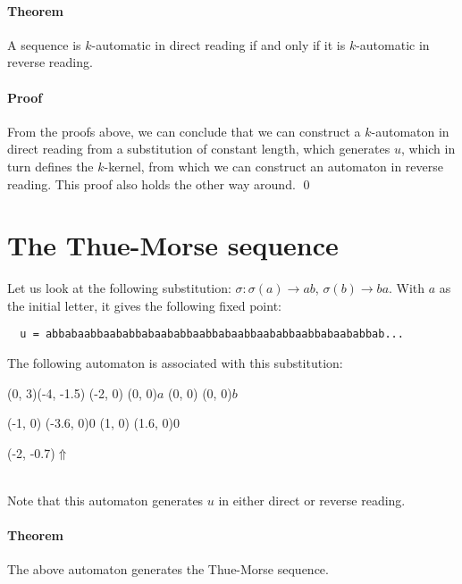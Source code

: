 \documentclass{article}
\begin{document}
\paragraph{Theorem} A sequence is $k$-automatic in direct reading if and only
if it is $k$-automatic in reverse reading.

\paragraph{Proof}
From the proofs above, we can conclude that we can construct a $k$-automaton in
direct reading from a substitution of constant length, which generates $u$,
which in turn defines the $k$-kernel, from which we can construct an automaton
in reverse reading. This proof also holds the other way around. \qed

\section*{The Thue-Morse sequence}
Let us look at the following substitution: $\sigma: \sigma(a) \rightarrow ab$,
$\sigma(b) \rightarrow ba$. With $a$ as the initial letter, it gives the
following fixed point:
\begin{verbatim}
  u = abbabaabbaababbabaababbaabbabaabbaababbaabbabaababbab...
\end{verbatim}
The following automaton is associated with this
substitution:\\
\begin{graph}(0, 3)(-4, -1.5)
  (-2, 0) (0, 0){$a$}
  (0, 0)  (0, 0){$b$}

  (-1, 0) \freetext(-3.6, 0){0}
   
   
  (1, 0) \freetext(1.6, 0){0}

  \freetext(-2, -0.7){$\Uparrow$}
\end{graph}\\
Note that this automaton generates $u$ in either direct or reverse reading.

\paragraph{Theorem} The above automaton generates the Thue-Morse sequence.
\end{document}

